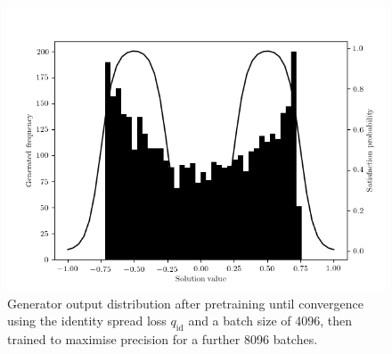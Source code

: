 \documentclass[../../main.tex]{subfiles}
\begin{document}
\begin{figure}[H]
    \begin{center}
    \includegraphics[width=\textwidth]{identityThenPrecision}
    \caption{
        Generator output distribution after pretraining until convergence using the identity spread loss $q_\text{id}$ and a batch size of 4096, then trained to maximise precision for a further 8096 batches.
    }
    \label{fig:identityThenPrecision}
    \end{center}
\end{figure}
\end{document}
